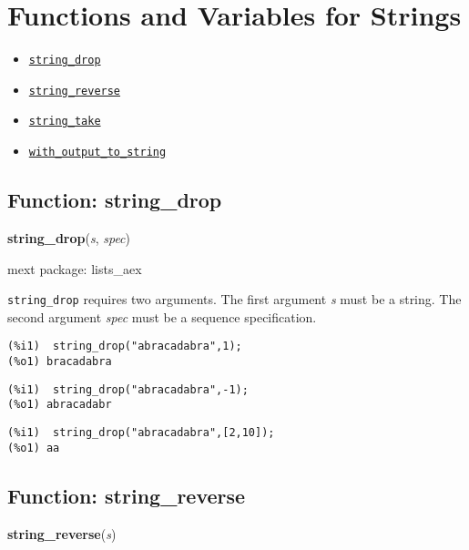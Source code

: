 \documentclass[]{article}
\begin{document}
\vspace{5 pt}


\section{Functions and Variables for Strings}
\begin{itemize}
\item \hyperlink{string_drop}{{\tt string\_drop}}
\item \hyperlink{string_reverse}{{\tt string\_reverse}}
\item \hyperlink{string_take}{{\tt string\_take}}
\item \hyperlink{with_output_to_string}{{\tt with\_output\_to\_string}}
\end{itemize}
\subsection{Function: string\_drop\label{sec:string_drop}}
\hypertarget{string_drop}{}
{\bf string\_drop}({\it s}, {\it spec})


\noindent mext package: lists\_aex



\vspace{5 pt}
   {\tt string\_drop} requires two arguments.
    The first argument {\it s} must be a string.
    The second argument {\it spec} must be a sequence specification.


\vspace{5 pt}


\begin{Verbatim}[frame=single]
(%i1)  string_drop("abracadabra",1);
(%o1) bracadabra
\end{Verbatim}

\begin{Verbatim}[frame=single]
(%i1)  string_drop("abracadabra",-1);
(%o1) abracadabr
\end{Verbatim}

\begin{Verbatim}[frame=single]
(%i1)  string_drop("abracadabra",[2,10]);
(%o1) aa
\end{Verbatim}


\subsection{Function: string\_reverse\label{sec:string_reverse}}
\hypertarget{string_reverse}{}
{\bf string\_reverse}({\it s})
\end{document}
